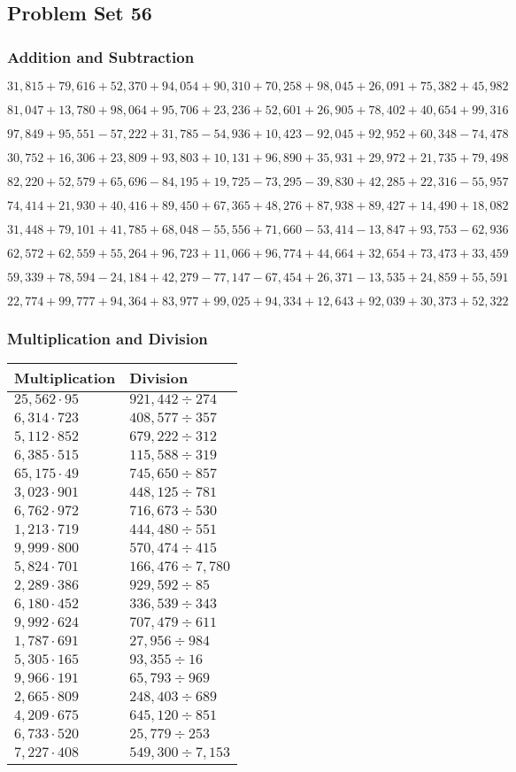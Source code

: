 \hypertarget{problem-set-56-3}{%
\subsection{Problem Set 56}\label{problem-set-56-3}}

\hypertarget{addition-and-subtraction-278}{%
\subsubsection{Addition and
Subtraction}\label{addition-and-subtraction-278}}

\(31,815+79,616+52,370+94,054+90,310+70,258+98,045+26,091+75,382+ 45,982\)

\(81,047+13,780+98,064+95,706+23,236+52,601+26,905+78,402+40,654+99,316\)

\(97,849+95,551-57,222+31,785-54,936+10,423-92,045+92,952+60,348-74,478\)

\(30,752+16,306+23,809+93,803+10,131+96,890+35,931+29,972+21,735+79,498\)

\(82,220+52,579+65,696-84,195+19,725-73,295-39,830+42,285+22,316-55,957\)

\(74,414+21,930+40,416+89,450+67,365+48,276+87,938+89,427+14,490+18,082\)

\(31,448+79,101+41,785+68,048-55,556+71,660-53,414-13,847+93,753-62,936\)

\(62,572+62,559+55,264+96,723+11,066+96,774+44,664+32,654+73,473+33,459\)

\(59,339+78,594-24,184+42,279-77,147-67,454+26,371-13,535+24,859+55,591\)

\(22,774+99,777+94,364+83,977+99,025+94,334+12,643+92,039+30,373+52,322\)

\hypertarget{multiplication-and-division-277}{%
\subsubsection{Multiplication and
Division}\label{multiplication-and-division-277}}

\begin{longtable}[]{@{}ll@{}}
\toprule
Multiplication & Division\tabularnewline
\midrule
\endhead
\(25,562\cdot95\) & \(921,442÷274\)\tabularnewline
\(6,314\cdot723\) & \(408,577÷357\)\tabularnewline
\(5,112\cdot852\) & \(679,222÷312\)\tabularnewline
\(6,385\cdot515\) & \(115,588 ÷319\)\tabularnewline
\(65,175\cdot49\) & \(745,650÷857\)\tabularnewline
\(3,023\cdot901\) & \(448,125÷781\)\tabularnewline
\(6,762\cdot972\) & \(716,673÷530\)\tabularnewline
\(1,213\cdot719\) & \(444,480÷551\)\tabularnewline
\(9,999\cdot800\) & \(570,474÷415\)\tabularnewline
\(5,824\cdot701\) & \(166,476÷7,780\)\tabularnewline
\(2,289\cdot386\) & \(929,592÷85\)\tabularnewline
\(6,180\cdot452\) & \(336,539÷343\)\tabularnewline
\(9,992\cdot624\) & \(707,479÷611\)\tabularnewline
\(1,787\cdot691\) & \(27,956÷984\)\tabularnewline
\(5,305\cdot165\) & \(93,355÷16\)\tabularnewline
\(9,966\cdot191\) & \(65,793÷969\)\tabularnewline
\(2,665\cdot809\) & \(248,403÷689\)\tabularnewline
\(4,209\cdot675\) & \(645,120÷851\)\tabularnewline
\(6,733\cdot520\) & \(25,779÷253\)\tabularnewline
\(7,227\cdot408\) & \(549,300÷7,153\)\tabularnewline
\bottomrule
\end{longtable}

